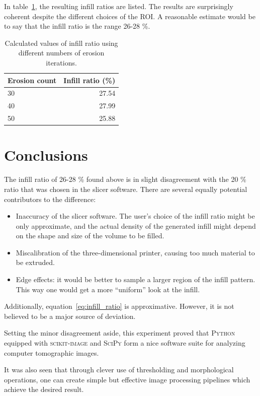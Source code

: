 \documentclass[a4paper,twoside,12pt]{article}
\begin{document}
In table~\ref{table:results}, the resulting infill ratios are listed. The results are surprisingly coherent despite the different choices of the ROI. A reasonable estimate would be to say that the infill ratio is the range 26-28 \%.
\begin{table}
    \centering
    \caption{Calculated values of infill ratio using different numbers of erosion iterations.}
    \label{table:results}
    \begin{tabular}{lr}
        \toprule
        Erosion count & Infill ratio (\%) \\
        \midrule
        30 & 27.54 \\
        40 & 27.99 \\
        50 & 25.88 \\
        \bottomrule
    \end{tabular}
\end{table}

\section{Conclusions}
The infill ratio of 26-28 \% found above is in slight disagreement with the 20 \% ratio that was chosen in the slicer software. There are several equally potential contributors to the difference:
\begin{itemize}
    \item Inaccuracy of the slicer software. The user's choice of the infill ratio might be only approximate, and the actual density of the generated infill might depend on the shape and size of the volume to be filled.
    \item Miscalibration of the three-dimensional printer, causing too much material to be extruded.
    \item Edge effects: it would be better to sample a larger region of the infill pattern. This way one would get a more ``uniform'' look at the infill.
\end{itemize}
Additionally, equation~\eqref{eq:infill_ratio} is approximative. However, it is not believed to be a major source of deviation.

Setting the minor disagreement aside, this experiment proved that \textsc{Python} equipped with \textsc{scikit-image} and \textsc{SciPy} form a nice software suite for analyzing computer tomographic images.

It was also seen that through clever use of thresholding and morphological operations, one can create simple but effective image processing pipelines which achieve the desired result.
\end{document}
